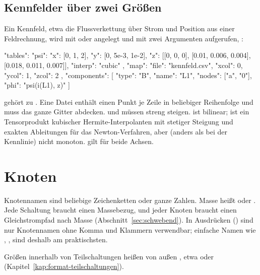 \subsection*{Kennfelder über zwei Größen}

Ein Kennfeld, etwa die Flussverkettung über Strom und Position aus einer
Feldrechnung, wird mit  oder  angelegt und mit zwei
Argumenten aufgerufen, :

\begin{json}
"tables": {
  "psi": { "x": [0, 1, 2], "y": [0, 5e-3, 1e-2],
           "z": [[0, 0, 0], [0.01, 0.006, 0.004], [0.018, 0.011, 0.007]],
           "interp": "cubic" },
  "map": { "file": "kennfeld.csv", "xcol": 0, "ycol": 1, "zcol": 2 }
},
"components": [
  { "type": "B", "name": "L1", "nodes": ["a", "0"], "phi": "psi(i(L1), z)" }
]
\end{json}

 gehört zu . Eine Datei enthält einen Punkt
je Zeile in beliebiger Reihenfolge und muss das ganze Gitter abdecken.
 und  müssen streng steigen.  ist bilinear;
 ist ein Tensorprodukt kubischer Hermite-Interpolanten mit
stetiger Steigung und exakten Ableitungen für das Newton-Verfahren, aber
(anders als bei der Kennlinie) nicht monoton.  gilt für beide
Achsen.

\section{Knoten}

Knotennamen sind beliebige Zeichenketten oder ganze Zahlen. Masse heißt
 oder . Jede Schaltung braucht einen Massebezug, und
jeder Knoten braucht einen Gleichstrompfad nach Masse
(Abschnitt~\ref{sec:schwebend}). In Ausdrücken () sind nur
Knotennamen ohne Komma und Klammern verwendbar; einfache Namen wie
, ,  sind deshalb am praktischsten.

Größen innerhalb von Teilschaltungen heißen von außen
, etwa  oder 
(Kapitel~\ref{kap:format-teilschaltungen}).

